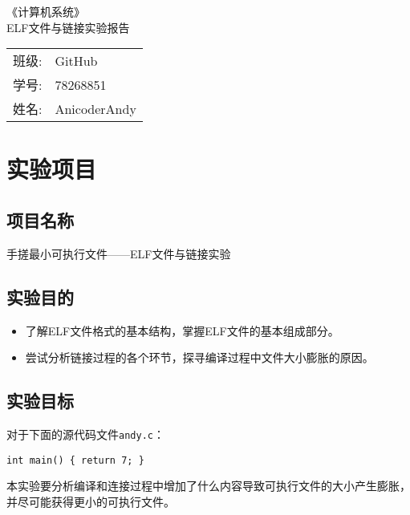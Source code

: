 \documentclass[a4paper, 11pt]{ctexart}
\let\oldsection\section
\renewcommand{\section}{\clearpage\oldsection}
\begin{document}
\sloppy
\begin{titlepage}
    \begin{center}
        \vspace*{5cm}
        \yahei{}《计算机系统》\\ \vspace{50pt}ELF文件与链接实验报告
        \vfill
        \begin{tabular}{ll}
            班级: & GitHub\\
            学号: & 78268851\\
            姓名: & AnicoderAndy\\
        \end{tabular}
    \end{center}
\end{titlepage}
\setcounter{page}{2}

\renewcommand{\contentsname}{\centering 目录}
\tableofcontents

\section{实验项目}
\setcounter{subsection}{0}
\subsection{项目名称}
手搓最小可执行文件——ELF文件与链接实验

\subsection{实验目的}
\begin{itemize}
    \item 了解ELF文件格式的基本结构，掌握ELF文件的基本组成部分。
    \item 尝试分析链接过程的各个环节，探寻编译过程中文件大小膨胀的原因。
\end{itemize}

\subsection{实验目标}
对于下面的源代码文件\texttt{andy.c}：

\begin{verbatim}
int main() { return 7; }
\end{verbatim}

本实验要分析编译和连接过程中增加了什么内容导致可执行文件的大小产生膨胀，并尽可能获得更小的可执行文件。
\end{document}
